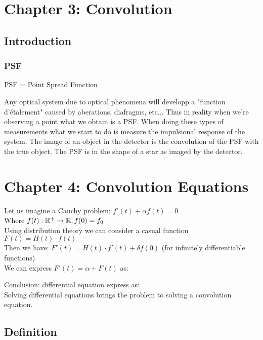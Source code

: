 \documentclass[11pt, openright]{book}
\begin{document}
\newpage

\section{Chapter 3: Convolution}

\subsection{Introduction}

\subsubsection{PSF}

PSF = Point Spread Function

Any optical system due to optical phenomena will developp a "function d'étalement" caused by aberations, diafragms, etc... Thus in reality when we're observing a point what we obtain is a PSF. When doing these types of measurements what we start to do is measure the impulsional response of the system. The image of an object in the detector is the convolution of the PSF with the true object. The PSF is in the shape of a star as imaged by the detector.


\section{Chapter 4: Convolution Equations}

Let us imagine a Cauchy problem: $f'(t)+\alpha f(t)=0$\\
Where $f(t): \mathbb{R}^+\to \mathbb{R}, f(0)=f_0$\\
Using distribution theory we can consider a casual function $F(t)=H(t)\cdot f(t)$\\
Then we have: $F'(t)=H(t)\cdot f'(t)+\delta f(0)$\hspace{\fill} (for infinitely differentiable functions)\\
We can express $F'(t)=\alpha+F(t)$ as:

Conclusion: differential equation express as: \\
Solving differential equations brings the problem to solving a convolution equation.

\subsection{Definition}
\end{document}
